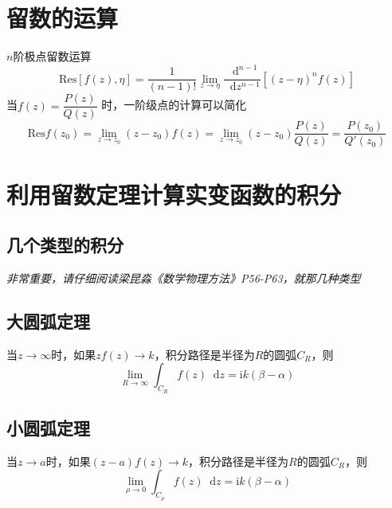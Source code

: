 \documentclass{article}
\newcommand*{\md}{\mathop{}\!\mathrm{d}}
\begin{document}
\section{留数的运算}
$n$阶极点留数运算
\begin{equation*}
  \mathrm{Res} \left[ f(z),\eta \right] = \dfrac{1}{(n - 1)!} \lim\limits_{z \rightarrow \eta} \dfrac{\md^{n-1}}{\md z^{n-1}} \left[ (z-\eta)^{n} f(z) \right]
\end{equation*}
当$f(z) = \dfrac{P(z)}{Q(z)} $ 时，一阶级点的计算可以简化
\begin{equation*}
  \mathrm{Res} f(z_{0}) = \lim\limits_{z \rightarrow z_{0}} (z - z_{0}) f(z) = \lim\limits_{z \rightarrow z_{0}} (z - z_{0}) \dfrac{P(z)}{Q(z)} =  \dfrac{P(z_{0})}{Q'(z_{0})} 
\end{equation*}

\section{利用留数定理计算实变函数的积分}

\subsection{几个类型的积分}



\emph{非常重要，请仔细阅读梁昆淼《数学物理方法》P56-P63，就那几种类型}

\subsection{大圆弧定理}

当$z \rightarrow \infty$时，如果$zf(z) \rightarrow k$，积分路径是半径为$R$的圆弧$C_{R}$，则
\begin{equation*}
  \lim\limits_{R \rightarrow \infty} \int_{C_{R}} f(z) \md z = \mathrm{i} k (\beta - \alpha)
\end{equation*}

\subsection{小圆弧定理}


当$z \rightarrow a$时，如果$(z-a)f(z) \rightarrow k$，积分路径是半径为$R$的圆弧$C_{R}$，则
\begin{equation*}
  \lim\limits_{\rho \rightarrow 0} \int_{C_{\rho}} f(z) \md z = \mathrm{i} k \left( \beta - \alpha  \right)
\end{equation*}
\end{document}

